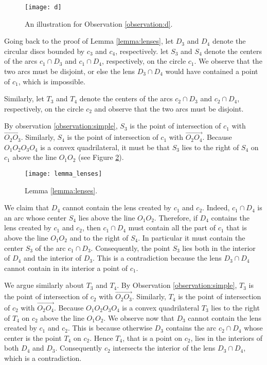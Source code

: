 \documentclass[11pt,a4paper]{article}
\begin{document}
\bigskip

\begin{figure}[ht]
	\centering
	\texttt{[image: d]}
	\caption{An illustration for Observation \ref{observation:d}.}
	\label{fig:d}
\end{figure}

Going back to the proof of Lemma \ref{lemma:lenses}, let $D_{3}$ and $D_{4}$ denote the circular discs bounded by $c_{3}$ and $c_{4}$, respectively.
let $S_{3}$ and $S_{4}$ denote the centers
of the arcs $c_{1} \cap D_{3}$ and $c_{1} \cap D_{4}$, respectively, on the circle $c_{1}$. We observe that the two arcs 
must be disjoint, or else the lens $D_{3} \cap D_{4}$ would have contained a point of $c_{1}$, which is impossible.

Similarly, let $T_{3}$ and $T_{4}$
denote the centers of the arcs $c_{2} \cap D_{3}$ and $c_{2} \cap D_{4}$, respectively, on the circle $c_{2}$
and observe that the two arcs must be disjoint.

By observation \ref{observation:simple},
$S_{3}$ is the point of intersection of $c_{1}$ with $\overrightarrow{O_{2}O_{3}}$. Similarly, $S_{4}$ is the point of intersection of $c_{1}$ with $\overrightarrow{O_{2}O_{4}}$.
Because $O_{1}O_{2}O_{3}O_{4}$ is a convex quadrilateral, it must be that $S_{3}$ lies to the right of $S_{4}$ on $c_{1}$
above the line $O_{1}O_{2}$ (see Figure \ref{fig:lemma_lenses}).

\begin{figure}[ht]
	\centering
	\texttt{[image: lemma\_lenses]}
	\caption{Lemma \ref{lemma:lenses}.}
	\label{fig:lemma_lenses}
\end{figure}

We claim that $D_{4}$ cannot contain the lens created by $c_{1}$ and $c_{2}$. Indeed, $c_{1} \cap D_{4}$ is an arc whose center $S_{4}$ lies above the line $O_{1}O_{2}$. Therefore, if $D_{4}$ contains the lens created by $c_{1}$ and $c_{2}$, then $c_{1} \cap D_{4}$ must contain all the part of $c_{1}$ that is above the line $O_{1}O_{2}$ and to the right of $S_{4}$. In particular it must contain the center $S_{3}$ of the arc $c_{1} \cap D_{3}$.
Consequently, the point $S_{3}$ lies both in the interior of $D_{4}$ and the interior of $D_{3}$. This is a contradiction because the lens $D_{3} \cap D_{4}$ cannot contain in its interior a point of $c_{1}$.

We argue similarly about $T_{3}$ and $T_{4}$. By Observation \ref{observation:simple},
$T_{3}$ is the point of intersection of $c_{2}$ with $\overrightarrow{O_{2}O_{3}}$. Similarly, $T_{4}$ is the point of intersection of $c_{2}$ with $\overrightarrow{O_{2}O_{4}}$.
Because $O_{1}O_{2}O_{3}O_{4}$ is a convex quadrilateral $T_{3}$ lies to the right of $T_{4}$ on $c_{2}$
above the line $O_{1}O_{2}$.
We observe now that $D_{3}$ cannot contain the lens created by $c_{1}$ and $c_{2}$. This is because 
otherwise $D_{3}$ contains the arc $c_{2} \cap D_{4}$ whose center is the point $T_{4}$ on $c_{2}$. Hence $T_{4}$, that is a point on $c_{2}$, lies in the interiors of both $D_{4}$ and $D_{3}$. Consequently $c_{2}$ intersects the interior of the lens $D_{3} \cap D_{4}$, which is a contradiction.
\end{document}
